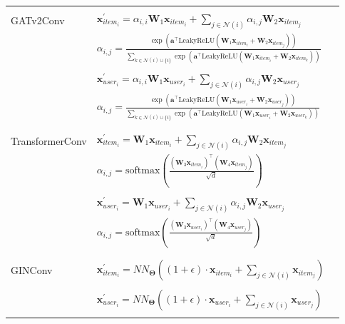 \documentclass{scrartcl}
\begin{document}
\begin{appendices}
\begin{longtable}{|l|l|l|}
     & \\
    GATv2Conv & $\mathbf{x}^{\prime}_{item_{i}} = \alpha_{i,i}\mathbf{W}_{1}\mathbf{x}_{item_{i}} + \sum_{j \in \mathcal{N}(i)} \alpha_{i,j}\mathbf{W}_{2}\mathbf{x}_{item_{j}}$\\
    & $\alpha_{i,j} = \frac{\exp\left(\mathbf{a}^{\top}\mathrm{LeakyReLU}\left(\mathbf{W}_{1} \mathbf{x}_{item_{i}} + \mathbf{W}_{2} \mathbf{x}_{item_{j}}\right)\right)}{\sum_{k \in \mathcal{N}(i) \cup \{ i \}} \exp\left(\mathbf{a}^{\top}\mathrm{LeakyReLU}\left(\mathbf{W}_{1} \mathbf{x}_{item_{i}} + \mathbf{W}_{2} \mathbf{x}_{item_{k}}\right)\right)}$ \\
     & \\
    & $\mathbf{x}^{\prime}_{user_{i}} = \alpha_{i,i}\mathbf{W}_{1}\mathbf{x}_{user_{i}} + \sum_{j \in \mathcal{N}(i)} \alpha_{i,j}\mathbf{W}_{2}\mathbf{x}_{user_{j}}$\\
    & $\alpha_{i,j} = \frac{\exp\left(\mathbf{a}^{\top}\mathrm{LeakyReLU}\left(\mathbf{W}_{1} \mathbf{x}_{user_{i}} + \mathbf{W}_{2} \mathbf{x}_{user_{j}}\right)\right)}{\sum_{k \in \mathcal{N}(i) \cup \{ i \}} \exp\left(\mathbf{a}^{\top}\mathrm{LeakyReLU}\left(\mathbf{W}_{1} \mathbf{x}_{user_{i}} + \mathbf{W}_{2} \mathbf{x}_{user_{k}}\right)\right)}$ \\
     & \\
    
    \rowcolor[gray]{0.9} & \\
    \rowcolor[gray]{0.9} TransformerConv & $\mathbf{x}^{\prime}_{item_{i}} = \mathbf{W}_1 \mathbf{x}_{item_{i}} + \sum_{j \in \mathcal{N}(i)} \alpha_{i,j} \mathbf{W}_2 \mathbf{x}_{item_{j}}$  \\
    \rowcolor[gray]{0.9} & $\alpha_{i,j} = \textrm{softmax} \left( \frac{(\mathbf{W}_3\mathbf{x}_{item_{i}})^{\top} (\mathbf{W}_4\mathbf{x}_{item_{j}})} {\sqrt{d}} \right)$ \\
    \rowcolor[gray]{0.9} & \\
    \rowcolor[gray]{0.9} & $\mathbf{x}^{\prime}_{user_{i}} = \mathbf{W}_1 \mathbf{x}_{user_{i}} + \sum_{j \in \mathcal{N}(i)} \alpha_{i,j} \mathbf{W}_2 \mathbf{x}_{user_{j}}$ \\
    \rowcolor[gray]{0.9} & $\alpha_{i,j} = \textrm{softmax} \left( \frac{(\mathbf{W}_3\mathbf{x}_{user_{i}})^{\top} (\mathbf{W}_4\mathbf{x}_{user_{j}})} {\sqrt{d}} \right)$ \\
    \rowcolor[gray]{0.9} & \\
    
     & \\
    GINConv & $\mathbf{x}^{\prime}_{item_{i}} = NN_{\mathbf{\Theta}} \left( (1 + \epsilon) \cdot \mathbf{x}_{item_{i}} + \sum_{j \in \mathcal{N}(i)} \mathbf{x}_{item_{j}} \right)$ \\
     & \\
    & $\mathbf{x}^{\prime}_{user_{i}} = NN_{\mathbf{\Theta}} \left( (1 + \epsilon) \cdot \mathbf{x}_{user_{i}} + \sum_{j \in \mathcal{N}(i)} \mathbf{x}_{user_{j}} \right)$ \\
     & \\
     

\end{longtable}
\end{appendices}
\end{document}
